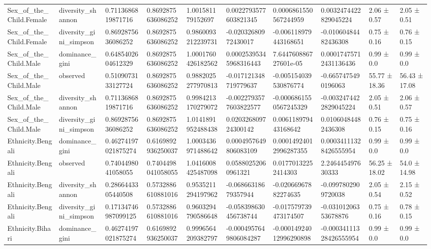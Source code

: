 \begin{longtable}{llllllllll}
Sex\_of\_the\_Child.Female & diversity\_shannon & 0.7113686819871716 & 0.8692875636086252 & 1.001581179152697 & 0.0022793577603821345 & 0.0006861550567244959 & 0.0032474422829045224 & 2.06 ± 0.57 & 2.05 ± 0.51 \\
Sex\_of\_the\_Child.Female & diversity\_gini\_simpson & 0.8692875636086252 & 0.8692875636086252 & 0.9860093212239731 & -0.02032680972430017 & -0.006118979443168651 & -0.01060484482436308 & 0.75 ± 0.16 & 0.76 ± 0.15 \\
Sex\_of\_the\_Child.Male & dominance\_gini & 0.6485402604612329 & 0.8692875636086252 & 1.0001760426182562 & 0.00025395345968316443 & 7.644760886727601e-05 & 0.00017475712431136436 & 0.99 ± 0.0 & 0.99 ± 0.0 \\
Sex\_of\_the\_Child.Male & observed & 0.5109073133127724 & 0.8692875636086252 & 0.9882025277970813 & -0.017121348719779637 & -0.005154039530876774 & -0.6657475490196063 & 55.77 ± 18.36 & 56.43 ± 17.08 \\
Sex\_of\_the\_Child.Male & diversity\_shannon & 0.7113686819871716 & 0.8692875636086252 & 0.9984213170279072 & -0.0022793577603822577 & -0.0006861550567245329 & -0.0032474422829045224 & 2.05 ± 0.51 & 2.06 ± 0.57 \\
Sex\_of\_the\_Child.Male & diversity\_gini\_simpson & 0.8692875636086252 & 0.8692875636086252 & 1.0141891952488438 & 0.020326809724300142 & 0.006118979443168642 & 0.01060484482436308 & 0.76 ± 0.15 & 0.75 ± 0.16 \\
Ethnicity.Bengali & dominance\_gini & 0.46274197021875274 & 0.6169892936250037 & 1.0003436971488642 & 0.0004957649806083109 & 0.00014924012996287355 & 0.00034111328426555954 & 0.99 ± 0.0 & 0.99 ± 0.0 \\
Ethnicity.Bengali & observed & 0.7404498041058055 & 0.7404498041058055 & 1.0416008425487098 & 0.05880252060961321 & 0.01770132252414303 & 2.246445497630333 & 56.25 ± 18.02 & 54.0 ± 14.98 \\
Ethnicity.Bengali & diversity\_shannon & 0.2866443305440508 & 0.5732886610881016 & 0.9535211294197962 & -0.06866318679357944 & -0.02066967882274635 & -0.0997802909720038 & 2.05 ± 0.54 & 2.15 ± 0.52 \\
Ethnicity.Bengali & diversity\_gini\_simpson & 0.17134746987099125 & 0.5732886610881016 & 0.9603294790586648 & -0.058398630456738744 & -0.017579739473174507 & -0.03101206353678876 & 0.75 ± 0.16 & 0.78 ± 0.15 \\
Ethnicity.Bihari & dominance\_gini & 0.46274197021875274 & 0.6169892936250037 & 0.9996564209382797 & -0.0004957649806084287 & -0.00014924012996290898 & -0.00034111328426555954 & 0.99 ± 0.0 & 0.99 ± 0.0 \\

\end{longtable}
